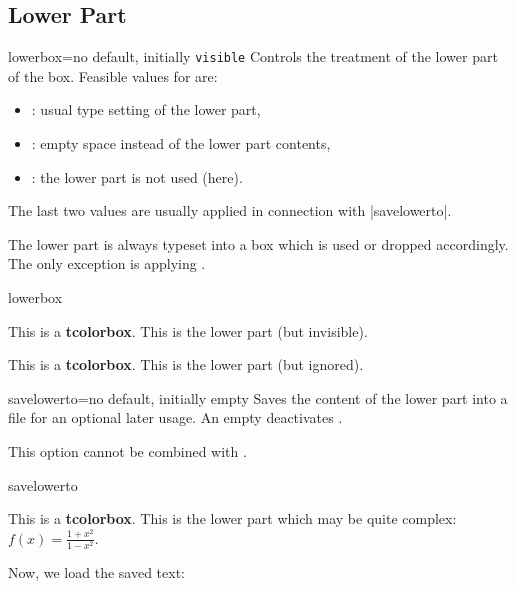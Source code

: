 \subsection{Lower Part}
\begin{docTcbKey}{lowerbox}{=}{no default, initially \texttt{visible}}
  Controls the treatment of the lower part of the box.
  Feasible values for  are:
  \begin{itemize}
  \item{}: usual type setting of the lower part,
  \item{}: empty space instead of the lower part contents,
  \item{}: the lower part is not used (here).
  \end{itemize}
  The last two values are usually applied in connection with |savelowerto|.

  \begin{marker}
  The lower part is always typeset into a box which is used or dropped
  accordingly. The only exception is applying .
  \end{marker}

\begin{exdispExample}{lowerbox}
\begin{tcolorbox}[lowerbox=invisible,colback=white]
This is a \textbf{tcolorbox}.
\tcblower
This is the lower part (but invisible).
\end{tcolorbox}

\begin{tcolorbox}[lowerbox=ignored,colback=white]
This is a \textbf{tcolorbox}.
\tcblower
This is the lower part (but ignored).
\end{tcolorbox}
\end{exdispExample}
\end{docTcbKey}


\clearpage
\begin{docTcbKey}[][doc updated=2014-11-28]{savelowerto}{=}{no default, initially empty}
  Saves the content of the lower part into a file for an optional later usage.
  An empty  deactivates .
  \begin{marker}
  This option cannot be combined with .
  \end{marker}

\begin{exdispExample}{savelowerto}
\begin{tcolorbox}[lowerbox=invisible,savelowerto=\jobname_bspsave.tex,colback=white]
This is a \textbf{tcolorbox}.
\tcblower
This is the lower part which may be quite complex:
$\displaystyle f(x)=\frac{1+x^2}{1-x^2}$.
\end{tcolorbox}

Now, we load the saved text:\\

\end{exdispExample}
\end{docTcbKey}

